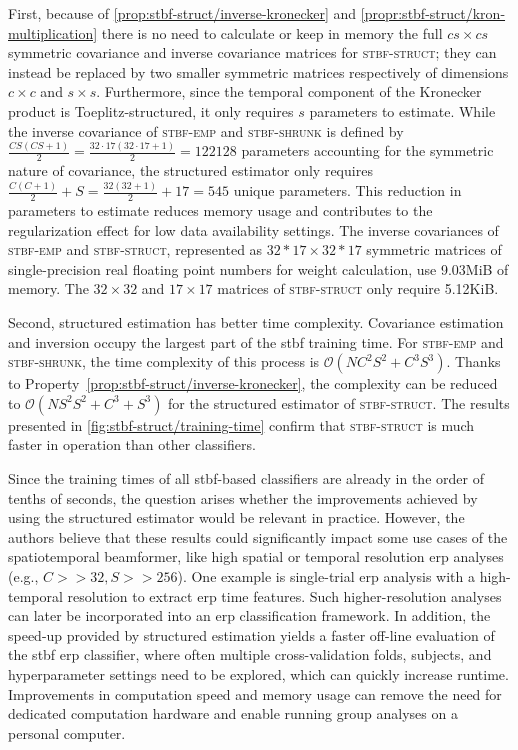 	First, because of \cref{prop:stbf-struct/inverse-kronecker} and
	\cref{propr:stbf-struct/kron-multiplication} there is no need to calculate or keep in memory the full $cs\times cs$
	symmetric covariance and inverse covariance matrices for \textsc{stbf-struct}; they can instead be replaced by two smaller symmetric matrices respectively of dimensions $c\times c$ and $s\times s$.
	Furthermore, since the temporal component of the Kronecker product is
	Toeplitz-structured, it only requires $s$ parameters to
	estimate.
	While the inverse covariance of \textsc{stbf-emp} and \textsc{stbf-shrunk} is
	defined by $\frac{CS(CS+1)}{2}=\frac{32\cdot17(32\cdot17+1)}{2}=\num{122128}$
	parameters accounting for the symmetric nature of
	covariance, the structured estimator only requires $\frac{C(C+1)}{2} + S =
		\frac{32(32+1)}{2} + 17=545$ unique parameters.
	This reduction in parameters to estimate reduces memory usage and contributes to the regularization effect for low data availability settings.
	The inverse covariances of \textsc{stbf-emp} and
	\textsc{stbf-struct}, represented as $32*17\times 32*17$ symmetric matrices of
	single-precision real floating point numbers for weight calculation,
	use 9.03MiB of memory.
	The $32\times 32$ and $17\times 17$ matrices of \textsc{stbf-struct} only
	require 5.12KiB.

	Second, structured estimation has better time complexity.
	Covariance estimation and inversion occupy the largest part of the \ac{stbf} training time.
	For \textsc{stbf-emp} and \textsc{stbf-shrunk}, the time complexity of this process is $\mathcal{O}(NC^2S^2+C^3S^3)$.
	Thanks to Property~\ref{prop:stbf-struct/inverse-kronecker}, the complexity can be reduced to
	$\mathcal{O}(NS^2S^2+C^3+S^3)$ for the structured estimator of \textsc{stbf-struct}.
	The results presented in \cref{fig:stbf-struct/training-time} confirm that
  \textsc{stbf-struct} is much faster in operation than other classifiers.

	Since the training times of all \ac{stbf}-based classifiers are already in
	the order of tenths of seconds, the question arises whether the
	improvements achieved by using the structured estimator would be relevant in
	practice.
	However, the authors believe that these results could significantly impact some
	use cases of the spatiotemporal beamformer, like high spatial or temporal
  resolution \ac{erp} analyses (e.g., $C>>32, S>>256$).
	One example is single-trial \ac{erp} analysis with a high-temporal
	resolution to extract \ac{erp} time features.
	Such higher-resolution analyses can later be incorporated into an \ac{erp}
	classification framework.
	In addition, the speed-up provided by structured estimation yields a faster
	off-line evaluation of the \ac{stbf} \ac{erp} classifier, where often multiple cross-validation folds, subjects, and hyperparameter settings need to be explored, which can quickly increase runtime.
	Improvements in computation speed and memory usage can remove the need for dedicated computation hardware and enable running group analyses on a personal computer.

